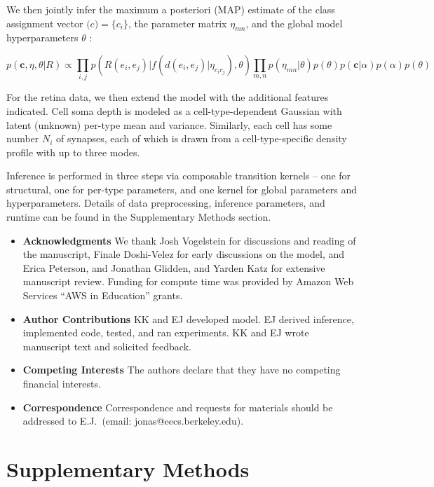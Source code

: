 \documentclass{article}
\renewcommand{\vec}[1]{\mathbf{#1}}
\begin{document}
We then jointly infer the maximum a posteriori (MAP) estimate of the
class assignment vector $\vec(c) = \{c_i\}$, the parameter matrix
$\eta_{mn}$, and the global model hyperparameters $\theta$ :

\begin{equation}
  p(\vec{c}, \eta, \theta | R ) \propto \prod_{i, j} p(R(e_i, e_j) | f(d(e_i, e_j) | \eta_{c_ic_j}), \theta) \prod_{m, n} p(\eta_{mn} | \theta)  p(\theta) p(\vec{c} | \alpha) p(\alpha) p(\theta)
\end{equation}

For the retina data, we then extend the model with the additional
features indicated. Cell soma depth is modeled as a
cell-type-dependent Gaussian with latent (unknown) per-type mean and
variance. Similarly, each cell has some number $N_i$ of synapses, 
each of which is drawn from a cell-type-specific density profile
with up to three modes.


Inference is performed in three steps via composable transition 
kernels -- one for structural, one for per-type parameters, and
one kernel for global parameters and hyperparameters. Details
of data preprocessing, inference parameters, and runtime can
be found in the Supplementary Methods section. 

\printbibliography

\begin{itemize}

 \item \textbf{Acknowledgments} We thank Josh Vogelstein for discussions and reading of the manuscript, Finale Doshi-Velez for early discussions on the model, and Erica Peterson, and Jonathan Glidden, and Yarden Katz for extensive manuscript review. Funding for compute time was provided by Amazon Web Services ``AWS in Education'' grants. 
\item \textbf{Author Contributions} KK and EJ developed model. EJ derived inference, implemented code, tested, and ran experiments. KK and EJ wrote manuscript text and solicited feedback. 
 \item \textbf{Competing Interests} The authors declare that they have no
competing financial interests.
 \item \textbf{Correspondence} Correspondence and requests for materials
should be addressed to E.J.~(email: jonas@eecs.berkeley.edu).
\end{itemize}

\newpage
\section*{Supplementary Methods }
\end{document}
